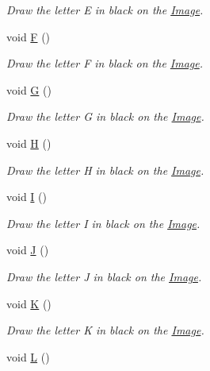 \begin{DoxyCompactItemize}
\begin{DoxyCompactList}\small\item\em Draw the letter E in black on the \mbox{\hyperlink{class_image}{Image}}. \end{DoxyCompactList}\item 
void \mbox{\hyperlink{class_font_v2_a061b1fab86aa9bae29fb7460a6ea6401}{F}} ()
\begin{DoxyCompactList}\small\item\em Draw the letter F in black on the \mbox{\hyperlink{class_image}{Image}}. \end{DoxyCompactList}\item 
void \mbox{\hyperlink{class_font_v2_a27ece9cc80af5c5d32cad07f00ed714c}{G}} ()
\begin{DoxyCompactList}\small\item\em Draw the letter G in black on the \mbox{\hyperlink{class_image}{Image}}. \end{DoxyCompactList}\item 
void \mbox{\hyperlink{class_font_v2_af03f8d436cc22f57b2bdd471b265896e}{H}} ()
\begin{DoxyCompactList}\small\item\em Draw the letter H in black on the \mbox{\hyperlink{class_image}{Image}}. \end{DoxyCompactList}\item 
void \mbox{\hyperlink{class_font_v2_aaace3b75c86f0536789a232f5b38321d}{I}} ()
\begin{DoxyCompactList}\small\item\em Draw the letter I in black on the \mbox{\hyperlink{class_image}{Image}}. \end{DoxyCompactList}\item 
void \mbox{\hyperlink{class_font_v2_a6cc91c88325f086dc95cd733ebda7849}{J}} ()
\begin{DoxyCompactList}\small\item\em Draw the letter J in black on the \mbox{\hyperlink{class_image}{Image}}. \end{DoxyCompactList}\item 
void \mbox{\hyperlink{class_font_v2_a1871c49a753378d2f50ad91ea8b26c10}{K}} ()
\begin{DoxyCompactList}\small\item\em Draw the letter K in black on the \mbox{\hyperlink{class_image}{Image}}. \end{DoxyCompactList}\item 
void \mbox{\hyperlink{class_font_v2_ae40068da683965bc711e752af9acf360}{L}} ()

\end{DoxyCompactItemize}
